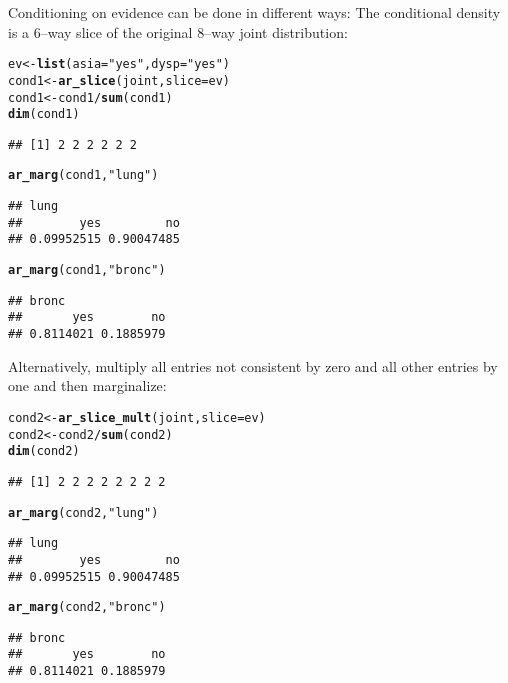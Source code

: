 \documentclass[10pt]{article}\usepackage[]{graphicx}\usepackage[]{color}
\makeatletter
\newcommand{\hlstr}[1]{\textcolor[rgb]{0.192,0.494,0.8}{#1}}%
\newcommand{\hlopt}[1]{\textcolor[rgb]{0,0,0}{#1}}%
\newcommand{\hlstd}[1]{\textcolor[rgb]{0.345,0.345,0.345}{#1}}%
\newcommand{\hlkwb}[1]{\textcolor[rgb]{0.69,0.353,0.396}{#1}}%
\newcommand{\hlkwc}[1]{\textcolor[rgb]{0.333,0.667,0.333}{#1}}%
\newcommand{\hlkwd}[1]{\textcolor[rgb]{0.737,0.353,0.396}{\textbf{#1}}}%
\newenvironment{kframe}{%
 \def\at@end@of@kframe{}%
 \ifinner\ifhmode%
  \def\at@end@of@kframe{\end{minipage}}%
  \begin{minipage}{\columnwidth}%
 \fi\fi%
 \def\FrameCommand##1{\hskip\@totalleftmargin \hskip-\fboxsep
 \colorbox{shadecolor}{##1}\hskip-\fboxsep
     \hskip-\linewidth \hskip-\@totalleftmargin \hskip\columnwidth}%
 \MakeFramed {\advance\hsize-\width
   \@totalleftmargin\z@ \linewidth\hsize
   \@setminipage}}%
 {\par\unskip\endMakeFramed%
 \at@end@of@kframe}
\newenvironment{knitrout}{}{} %
\makeatother
\begin{document}
Conditioning on evidence can be done in different ways: The conditional density is a $6$--way slice of the original $8$--way joint distribution:
\begin{knitrout}
\color{fgcolor}\begin{kframe}
\begin{alltt}
\hlstd{ev} \hlkwb{<-} \hlkwd{list}\hlstd{(}\hlkwc{asia}\hlstd{=}\hlstr{"yes"}\hlstd{,} \hlkwc{dysp}\hlstd{=}\hlstr{"yes"}\hlstd{)}
\hlstd{cond1} \hlkwb{<-} \hlkwd{ar_slice}\hlstd{(joint,} \hlkwc{slice}\hlstd{=ev)}
\hlstd{cond1} \hlkwb{<-} \hlstd{cond1} \hlopt{/} \hlkwd{sum}\hlstd{(cond1)}
\hlkwd{dim}\hlstd{(cond1)}
\end{alltt}
\begin{verbatim}
## [1] 2 2 2 2 2 2
\end{verbatim}
\begin{alltt}
\hlkwd{ar_marg}\hlstd{(cond1,} \hlstr{"lung"}\hlstd{)}
\end{alltt}
\begin{verbatim}
## lung
##        yes         no 
## 0.09952515 0.90047485
\end{verbatim}
\begin{alltt}
\hlkwd{ar_marg}\hlstd{(cond1,} \hlstr{"bronc"}\hlstd{)}
\end{alltt}
\begin{verbatim}
## bronc
##       yes        no 
## 0.8114021 0.1885979
\end{verbatim}
\end{kframe}
\end{knitrout}

Alternatively, multiply all entries not consistent by zero and all other entries by one and then marginalize:
\begin{knitrout}
\color{fgcolor}\begin{kframe}
\begin{alltt}
\hlstd{cond2} \hlkwb{<-} \hlkwd{ar_slice_mult}\hlstd{(joint,} \hlkwc{slice}\hlstd{=ev)}
\hlstd{cond2} \hlkwb{<-} \hlstd{cond2} \hlopt{/} \hlkwd{sum}\hlstd{(cond2)}
\hlkwd{dim}\hlstd{(cond2)}
\end{alltt}
\begin{verbatim}
## [1] 2 2 2 2 2 2 2 2
\end{verbatim}
\begin{alltt}
\hlkwd{ar_marg}\hlstd{(cond2,} \hlstr{"lung"}\hlstd{)}
\end{alltt}
\begin{verbatim}
## lung
##        yes         no 
## 0.09952515 0.90047485
\end{verbatim}
\begin{alltt}
\hlkwd{ar_marg}\hlstd{(cond2,} \hlstr{"bronc"}\hlstd{)}
\end{alltt}
\begin{verbatim}
## bronc
##       yes        no 
## 0.8114021 0.1885979
\end{verbatim}
\end{kframe}
\end{knitrout}
\end{document}
